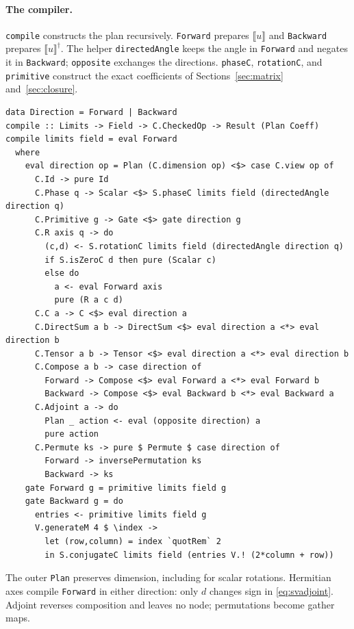\documentclass[11pt,a4paper]{article}
\newcommand{\sem}[1]{\llbracket #1\rrbracket}
\newcommand{\code}[1]{\texttt{#1}}
\begin{document}
\paragraph{The compiler.}
\code{compile} constructs the plan recursively. \code{Forward} prepares
$\sem u$ and \code{Backward} prepares $\sem u^\dagger$.
The helper \code{directedAngle} keeps the angle in \code{Forward} and
negates it in \code{Backward}; \code{opposite} exchanges the directions.
\code{phaseC}, \code{rotationC}, and \code{primitive} construct the exact
coefficients of Sections~\ref{sec:matrix} and~\ref{sec:closure}.
\begin{lstlisting}[label=lst:plan-compile]
data Direction = Forward | Backward
compile :: Limits -> Field -> C.CheckedOp -> Result (Plan Coeff)
compile limits field = eval Forward
  where
    eval direction op = Plan (C.dimension op) <$> case C.view op of
      C.Id -> pure Id
      C.Phase q -> Scalar <$> S.phaseC limits field (directedAngle direction q)
      C.Primitive g -> Gate <$> gate direction g
      C.R axis q -> do
        (c,d) <- S.rotationC limits field (directedAngle direction q)
        if S.isZeroC d then pure (Scalar c)
        else do
          a <- eval Forward axis
          pure (R a c d)
      C.C a -> C <$> eval direction a
      C.DirectSum a b -> DirectSum <$> eval direction a <*> eval direction b
      C.Tensor a b -> Tensor <$> eval direction a <*> eval direction b
      C.Compose a b -> case direction of
        Forward -> Compose <$> eval Forward a <*> eval Forward b
        Backward -> Compose <$> eval Backward b <*> eval Backward a
      C.Adjoint a -> do
        Plan _ action <- eval (opposite direction) a
        pure action
      C.Permute ks -> pure $ Permute $ case direction of
        Forward -> inversePermutation ks
        Backward -> ks
    gate Forward g = primitive limits field g
    gate Backward g = do
      entries <- primitive limits field g
      V.generateM 4 $ \index ->
        let (row,column) = index `quotRem` 2
        in S.conjugateC limits field (entries V.! (2*column + row))
\end{lstlisting}
\begin{samepage}
The outer \code{Plan} preserves dimension, including for scalar rotations.
Hermitian axes compile \code{Forward} in either direction: only $d$
changes sign in \eqref{eq:svadjoint}. Adjoint reverses composition and
leaves no node; permutations become gather maps.
\par
\end{samepage}
\end{document}
